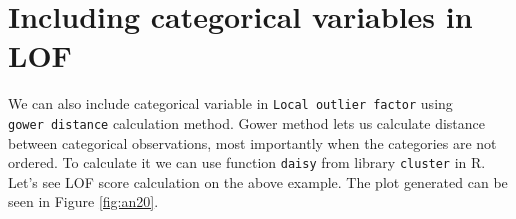 \documentclass[
]{book}
\newenvironment{Shaded}{\begin{snugshade}}{\end{snugshade}}
\newcommand{\AttributeTok}[1]{\textcolor[rgb]{0.13,0.29,0.53}{#1}}
\newcommand{\ConstantTok}[1]{\textcolor[rgb]{0.56,0.35,0.01}{#1}}
\newcommand{\DecValTok}[1]{\textcolor[rgb]{0.00,0.00,0.81}{#1}}
\newcommand{\FunctionTok}[1]{\textcolor[rgb]{0.13,0.29,0.53}{\textbf{#1}}}
\newcommand{\NormalTok}[1]{#1}
\newcommand{\OtherTok}[1]{\textcolor[rgb]{0.56,0.35,0.01}{#1}}
\newcommand{\SpecialCharTok}[1]{\textcolor[rgb]{0.81,0.36,0.00}{\textbf{#1}}}
\newcommand{\StringTok}[1]{\textcolor[rgb]{0.31,0.60,0.02}{#1}}
\begin{document}
\hypertarget{including-categorical-variables-in-lof}{%
\section{Including categorical variables in LOF}\label{including-categorical-variables-in-lof}}

We can also include categorical variable in \texttt{Local\ outlier\ factor} using \texttt{gower\ distance} calculation method. Gower method lets us calculate distance between categorical observations, most importantly when the categories are not ordered. To calculate it we can use function \texttt{daisy} from library \texttt{cluster} in R. Let's see LOF score calculation on the above example. The plot generated can be seen in Figure \ref{fig:an20}.

\begin{Shaded}
\end{Shaded}
\end{document}
